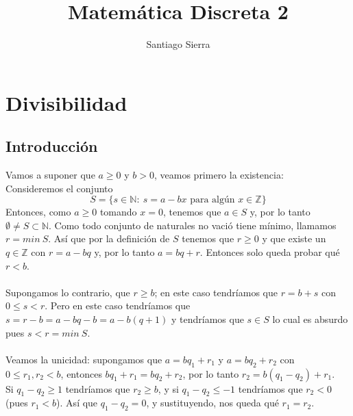\documentclass{report}
\title{\Huge{Matemática Discreta 2}}
\author{\huge{Santiago Sierra}}
\date{}
\begin{document}
\maketitle
\newpage%
\tableofcontents
\pagebreak

\chapter{Divisibilidad}
\section{Introducción}
\begin{myproof}
	Vamos a suponer que $a\ge 0$ y $b>0$, veamos primero la existencia:
	\\Consideremos el conjunto $$S=\{s\in\mathbb{N}:\ s=a-bx\text{ para algún }x\in\mathbb{Z}\}$$
	Entonces, como $a\ge 0$ tomando $x=0$, tenemos que $a\in S$ y, por lo tanto $\emptyset\neq S\subset\mathbb{N}$. Como todo conjunto de naturales no vació tiene mínimo, llamamos $r=min\ S$. Así que por la definición de $S$ tenemos que $r\ge 0$ y que existe un $q\in\mathbb{Z}$ con $r=a-bq$ y, por lo tanto $a=bq+r$. Entonces solo queda probar qué $r<b$.\\\\
	Supongamos lo contrario, que $r\ge b$; en este caso tendríamos que $r=b+s$ con $0\le s<r$. Pero en este caso tendríamos que $s=r-b=a-bq-b=a-b(q+1)$ y tendríamos que $s\in S$ lo cual es absurdo pues $s<r=min\ S$.\\\\
	Veamos la unicidad: supongamos que $a=bq_1+r_1$ y $a=bq_2+r_2$ con $0\le r_1,r_2<b$, entonces $bq_1+r_1=bq_2+r_2$, por lo tanto $r_2=b(q_1-q_2)+r_1$.\\
	Si $q_1-q_2\ge 1$ tendríamos que $r_2\ge b$, y si $q_1-q_2\le -1$ tendríamos que $r_2<0$ (pues $r_1<b$). Así que $q_1-q_2=0$, y sustituyendo, nos queda qué $r_1=r_2$.
\end{myproof}
\end{document}
